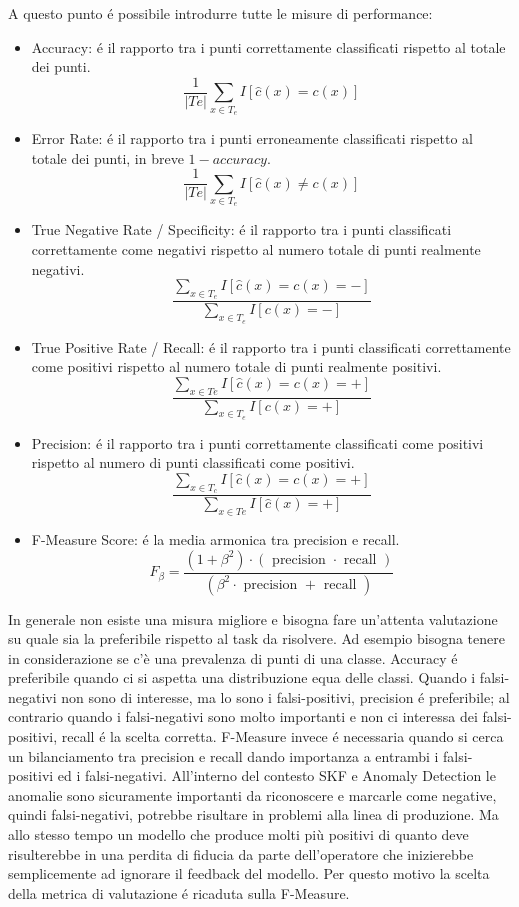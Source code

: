A questo punto é possibile introdurre tutte le misure di performance:
\begin{itemize}
\item Accuracy: é il rapporto tra i punti correttamente classificati rispetto al totale dei punti.
\[\frac{1}{|Te|} \sum_{x \in T_e} I[\hat{c}(x)=c(x)]\]
\item Error Rate: é il rapporto tra i punti erroneamente classificati rispetto al totale dei punti, in breve \(1-accuracy\).
\[\frac{1}{|Te|} \sum_{x \in T_e} I[\hat{c}(x)\neq c(x)]\]
\item True Negative Rate / Specificity: é il rapporto tra i punti classificati correttamente come negativi rispetto al numero totale di punti realmente negativi.
\[\frac{\sum_{x \in T_e} I[\hat{c}(x)=c(x)=-]}{\sum_{x \in T_e} I[c(x)=-]}\]
\item True Positive Rate / Recall: é il rapporto tra i punti classificati correttamente come positivi rispetto al numero totale di punti realmente positivi.
\[\frac{\sum_{x \in T e} I[\hat{c}(x)=c(x)=+]}{\sum_{x \in T_e} I[c(x)=+]}\]
\item Precision: é il rapporto tra i punti correttamente classificati come positivi rispetto al numero di punti classificati come positivi.
\[\frac{\sum_{x \in T_c} I[\hat{c}(x)=c(x)=+]}{\sum_{x \in T e} I[\hat{c}(x)=+]}\]
\item F-Measure Score: é la media armonica tra precision e recall.
\[F_\beta=\frac{\left(1+\beta^2\right) \cdot(\text { precision } \cdot \text { recall })}{\left(\beta^2 \cdot \text { precision }+\text { recall }\right)}\]
\end{itemize}

In generale non esiste una misura migliore e bisogna fare un'attenta valutazione su quale sia la preferibile rispetto al task da risolvere.
Ad esempio bisogna tenere in considerazione se c'è una prevalenza di punti di una classe. Accuracy é preferibile quando ci si aspetta una distribuzione equa delle classi. Quando i falsi-negativi non sono di interesse, ma lo sono i falsi-positivi, precision é preferibile; al contrario quando i falsi-negativi sono molto importanti e non ci interessa dei falsi-positivi, recall é la scelta corretta.
F-Measure invece é necessaria quando si cerca un bilanciamento tra precision e recall dando importanza a entrambi i falsi-positivi ed i falsi-negativi. 
All'interno del contesto SKF e Anomaly Detection le anomalie sono sicuramente importanti da riconoscere e marcarle come negative, quindi falsi-negativi, potrebbe risultare in problemi alla linea di produzione. Ma allo stesso tempo un modello che produce molti più positivi di quanto deve risulterebbe in una perdita di fiducia da parte dell'operatore che inizierebbe semplicemente ad ignorare il feedback del modello. Per questo motivo la scelta della metrica di valutazione é ricaduta sulla F-Measure.




